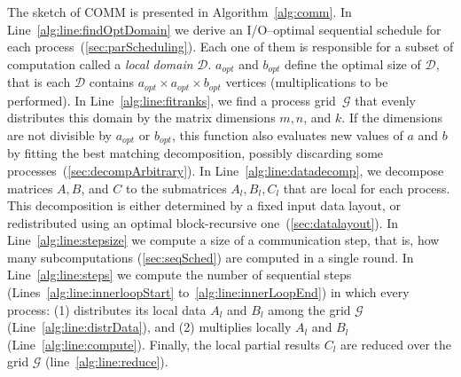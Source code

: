 \documentclass[sigplan,review,anonymous,10pt]{acmart}\settopmatter{printfolios=true,printccs=false,printacmref=false}
\newcommand\mac[1]{\textcolor{red}{[Mac: #1]}}
\begin{document}
The sketch of COMM is presented in Algorithm~\ref{alg:comm}.
In
Line~\ref{alg:line:findOptDomain} 
we derive an 
I/O--optimal sequential schedule for each process~(\cref{sec:parScheduling}). 
Each one of them is responsible for a subset 
of 
computation called a \emph{local domain} $\mathcal{D}$. $a_{opt}$ and 
$b_{opt}$ define the 
optimal size of $\mathcal{D}$, that is each $\mathcal{D}$ contains $a_{opt} 
\times a_{opt} 
\times b_{opt}$ vertices (multiplications to be performed).
 In 
Line~\ref{alg:line:fitranks}, we 
find a process
grid~$\mathcal{G}$ that evenly distributes this domain by the matrix dimensions 
$m,n$,
and $k$. If the dimensions are not divisible by $a_{opt}$ or $b_{opt}$, this
function also evaluates new values of $a$ and $b$ by fitting the best matching
decomposition, possibly discarding some processes~(\cref{sec:decompArbitrary}).
In Line~\ref{alg:line:datadecomp}, 
we decompose matrices $A, B$, and $C$ to the submatrices $A_l, B_l, C_l$ that 
are 
local for 
each process.
This decomposition is either  
%
determined by a fixed input data layout, or redistributed using an optimal 
block-recursive
one~(\cref{sec:datalayout}). 
In Line~\ref{alg:line:stepsize} we compute a size of a 
communication step, that is, how many subcomputations 
(\cref{sec:seqSched}) are computed in a single round.
In Line~\ref{alg:line:steps} we 
compute the number of
sequential steps (Lines~\ref{alg:line:innerloopStart}
to~\ref{alg:line:innerLoopEnd}) in which every process: (1) distributes its
local data $A_l$ and $B_l$  among the grid $\mathcal{G}$ 
(Line~\ref{alg:line:distrData}),
and (2) multiplies locally $A_l$ and $B_l$
(Line~\ref{alg:line:compute}). Finally, the local partial results $C_l$ are
reduced over the grid $\mathcal{G}$ (line~\ref{alg:line:reduce}).
\end{document}
